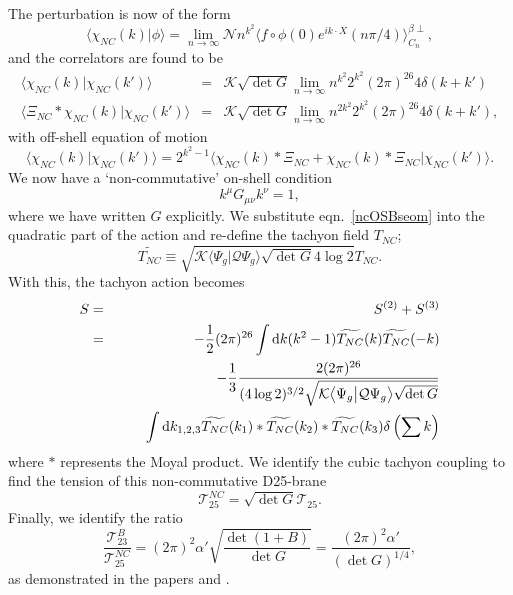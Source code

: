 \documentclass[letterpaper,12pt]{article}
\def\Pcm#1{{\mathcal{#1}}}
\def\nn{\nonumber}
\def\er#1{eqn.~\eqref{#1}}
\newcommand{\td}{\textup{d}}
\begin{document}
The perturbation is now of the form
\begin{equation}
\label{chiNC}
\big\langle \chi_{NC}(k) \big| \phi \big\rangle = \lim_{n \rightarrow \infty}
                       \Pcm{N}n^{k^2}\big\langle f \circ \phi(0)
                       e^{ik\cdot X}(n\pi/4)\big\rangle^{\beta \perp}_{C_n}
,\end{equation}
and the correlators are found to be
\begin{eqnarray}
\label{ncOSBseom}
   \big\langle\chi_{NC}(k)\big|\chi_{NC}(k')\big\rangle &=&
     \Pcm{K}\sqrt{\det G}
    \lim_{n\rightarrow\infty} n^{k^2}
    2^{k^2} %
    (2\pi)^{26}4\delta(k+k')
\label{ncOSBseomm} \\
   \big\langle \Xi_{NC} * \chi_{NC}(k) \big| \chi_{NC}(k') \big\rangle &=&
    \Pcm{K}\sqrt{\det G}
    \lim_{n\rightarrow\infty} n^{2k^2}
    2^{k^2} %
    (2\pi)^{26}4\delta(k+k')
,\end{eqnarray}
with off-shell equation of motion
\begin{equation}
\label{ncOSBseommm}
  \big\langle\chi_{NC}(k)\big|\chi_{NC}(k')\big\rangle =  2^{k^2-1}
     \big\langle \chi_{NC}(k) * \Xi_{NC} + \chi_{NC}(k) * \Xi_{NC} \big| \chi_{NC}(k') \big\rangle 
.\end{equation}
We now have a `non-commutative' on-shell condition 
\begin{equation}
\label{NConshBc}
 k^\mu G_{\mu\nu} k^\nu =1 
,\end{equation}
where we have written $G$ explicitly.
We substitute \er{ncOSBseom} into the quadratic part of the action and re-define the tachyon field $T_{NC}$;
\begin{equation}
\widetilde{T_{NC}} \equiv 
  \sqrt{\Pcm{K} \big\langle\Psi_g\big|\Pcm{Q}\Psi_g\big\rangle \sqrt{\det G} 4\log 2 } T_{NC}
.\end{equation}
With this, the tachyon action becomes
\begin{eqnarray}
 S&=&S^{(2)}+S^{(3)} \nn\\
  &=&-\frac12(2\pi)^{26}\int \td k (k^2-1) \widetilde{T_{NC}}(k) \widetilde{T_{NC}}(-k) \nn\\
  & &-\frac13\frac{2(2\pi)^{26}}{(4\log 2)^{3/2}  \sqrt{\Pcm{K} \big\langle\Psi_g\big|\Pcm{Q}\Psi_g\big\rangle \sqrt{\det G}}} \nn\\
  & & \qquad \int \td k_{1,2,3}  \widetilde{T_{NC}}(k_1) * \widetilde{T_{NC}}(k_2) * \widetilde{T_{NC}}(k_3)  \delta\left(\sum k\right)
\end{eqnarray}
where $*$ represents the Moyal product.
We identify the cubic tachyon coupling to find the tension of this non-commutative D25-brane
\begin{equation}
\label{NCtension}
\Pcm{T}_{25}^{NC} = \sqrt{\det G} \Pcm{T}_{25}
.\end{equation}
Finally, we identify the ratio
\begin{equation}
\frac{\Pcm{T}^B_{23}}{\Pcm{T}_{25}^{NC}} = (2\pi)^2\alpha'\sqrt{\frac{\det (1+B)}{\det G}}=\frac{(2\pi)^2\alpha'}{(\det G)^{1/4}}
,\end{equation}
as demonstrated in the papers \cite{BMM} and \cite{Okuyama}.
\end{document}
